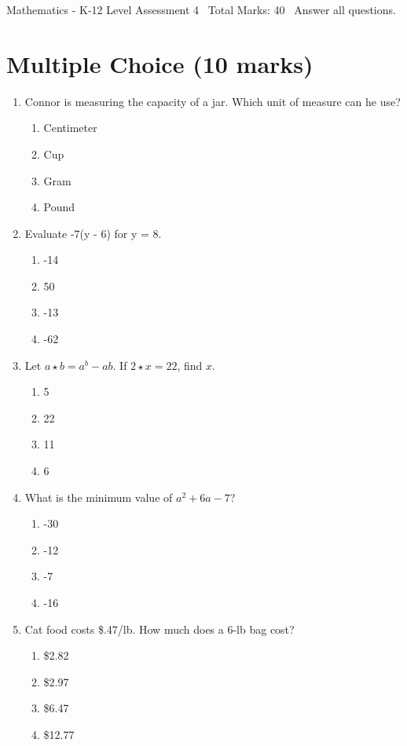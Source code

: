 \documentclass[12pt]{article}
\begin{document}
\begin{center}
Mathematics - K-12 Level Assessment 4 \
Total Marks: 40 \
Answer all questions.
\end{center}

\section*{Multiple Choice (10 marks)}
\begin{enumerate}[label=\arabic*.]
\item Connor is measuring the capacity of a jar. Which unit of measure can he use?
\begin{enumerate}[label=(\alph*)]
    \item Centimeter
    \item Cup
    \item Gram
    \item Pound
\end{enumerate}
\item Evaluate -7(y - 6) for y = 8.
\begin{enumerate}[label=(\alph*)]
    \item -14
    \item 50
    \item -13
    \item -62
\end{enumerate}
\item Let $a\star b = a^b-ab$. If $2\star x = 22$, find $x$.
\begin{enumerate}[label=(\alph*)]
    \item 5
    \item 22
    \item 11
    \item 6
\end{enumerate}
\item What is the minimum value of $a^2+6a-7$?
\begin{enumerate}[label=(\alph*)]
    \item -30
    \item -12
    \item -7
    \item -16
\end{enumerate}
\item Cat food costs \$.47/lb. How much does a 6-lb bag cost?
\begin{enumerate}[label=(\alph*)]
    \item \$2.82
    \item \$2.97
    \item \$6.47
    \item \$12.77
\end{enumerate}
\end{enumerate}
\end{document}
